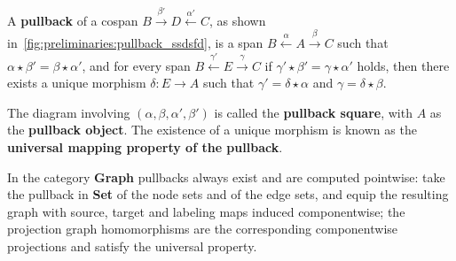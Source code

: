 \begin{definition} 
    \label{def:cat:pb}
   A \textbf{pullback} of a cospan \(B \overset{\beta'}{\rightarrow} D \overset{\alpha'}{\leftarrow} C \), as shown in~\autoref{fig:preliminaries:pullback_ssdsfd},
is a span \( B \overset{\alpha}{\leftarrow} A \overset{\beta}{\rightarrow} C \) such that \( \alpha \star \beta' = \beta \star \alpha' \), and for every span \( B \overset{\gamma'}{\leftarrow} E \overset{\gamma}{\rightarrow} C \) if \(\gamma' \star \beta' = \gamma \star \alpha'\) holds, then there exists a unique morphism \(\delta: E \to A\) such that $\gamma' = \delta \star \alpha$ and $\gamma = \delta \star \beta$. 
    \begin{figure}[H]
        \centering  
        \caption{}
        \label{fig:preliminaries:pullback_ssdsfd}
    \end{figure}
The diagram involving \( (\alpha, \beta, \alpha', \beta') \) is called the \textbf{pullback square}, with \(A\) as the \textbf{pullback object}. The existence of a unique morphism is known as the \textbf{universal mapping property of the pullback}.
\end{definition} 
In the category \textbf{Graph} pullbacks always exist and are computed pointwise: take the pullback in \textbf{Set} of the node sets and of the edge sets, and equip the resulting graph with source, target and labeling maps induced componentwise; the projection graph homomorphisms are the corresponding componentwise projections and satisfy the universal property.
